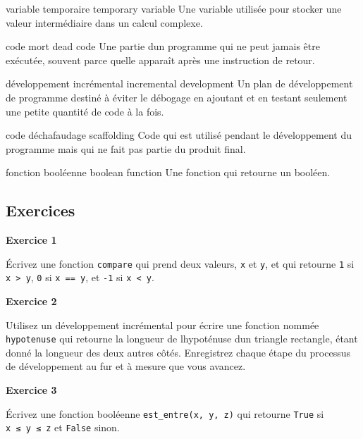 variable temporaire temporary variable Une variable utilisée pour
stocker une valeur intermédiaire dans un calcul complexe.

code mort dead code Une partie d\textquotesingle un programme qui ne
peut jamais être exécutée, souvent parce qu\textquotesingle elle
apparaît après une instruction de retour.

développement incrémental incremental development Un plan de
développement de programme destiné à éviter le débogage en ajoutant et
en testant seulement une petite quantité de code à la fois.

code d\textquotesingle échafaudage scaffolding Code qui est utilisé
pendant le développement du programme mais qui ne fait pas partie du
produit final.

fonction booléenne boolean function Une fonction qui retourne un
booléen.

\hypertarget{exercices}{%
\subsection{Exercices}\label{exercices}}

\textbf{Exercice 1}

Écrivez une fonction \texttt{compare} qui prend deux valeurs, \texttt{x}
et \texttt{y}, et qui retourne \texttt{1} si
\texttt{x\ \textgreater{}\ y}, \texttt{0} si \texttt{x\ ==\ y}, et
\texttt{-1} si \texttt{x\ \textless{}\ y}.

\textbf{Exercice 2}

Utilisez un développement incrémental pour écrire une fonction nommée
\texttt{hypotenuse} qui retourne la longueur de
l\textquotesingle hypoténuse d\textquotesingle un triangle rectangle,
étant donné la longueur des deux autres côtés. Enregistrez chaque étape
du processus de développement au fur et à mesure que vous avancez.

\textbf{Exercice 3}

Écrivez une fonction booléenne \texttt{est\_entre(x,\ y,\ z)} qui
retourne \texttt{True} si \texttt{x\ ≤\ y\ ≤\ z} et \texttt{False}
sinon.
